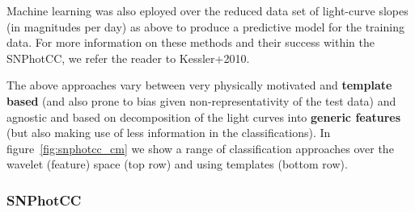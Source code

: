 Machine learning was also eployed over the reduced data set of light-curve slopes (in magnitudes per day) as above to produce a predictive model for the training data. For more information on these methods and their success within the SNPhotCC, we refer the reader to Kessler+2010.

The above approaches vary between very physically motivated and \textbf{template based} (and also prone to bias given non-representativity of the test data) and agnostic and based on decomposition of the light curves into \textbf{generic features} (but also making use of less information in the classifications).
In figure~\ref{fig:snphotcc_cm} we show a range of classification approaches over the wavelet (feature) space (top row) and using templates (bottom row).

\subsubsection{SNPhotCC}
\label{sec:snphotcc}

